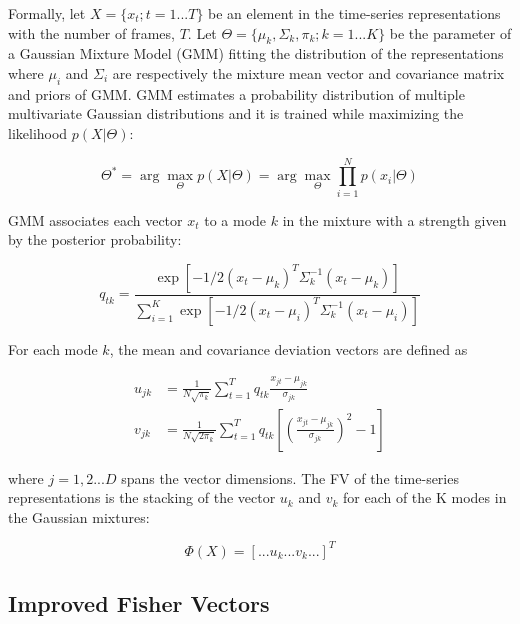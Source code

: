 Formally, let $X = \{x_t; t=1...T\}$ be an element in the time-series representations with the number of frames, $T$. Let $\Theta = \{\mu_k, \Sigma_k, \pi_k; k=1...K\}$ be the parameter of a Gaussian Mixture Model (GMM) fitting the distribution of the representations where $\mu_i$ and $\Sigma_i$ are respectively the mixture mean vector and covariance matrix and priors of GMM. GMM estimates a probability distribution of multiple multivariate Gaussian distributions and it is trained while maximizing the likelihood $p(X|\Theta)$:

\begin{equation}
    \Theta^{*} = \arg \max_{\Theta} p(X|\Theta) = \arg \max_{\Theta} \prod_{i=1}^{N} p(x_i|\Theta)
\end{equation}

GMM associates each vector $x_t$ to a mode $k$ in the mixture with a strength given by the posterior probability:

\begin{equation}
    q_{tk} = \frac{\exp [-1/2 (x_t-\mu_k)^{T} \Sigma_k^{-1}(x_t-\mu_k)]}{\sum_{i=1}^{K} \exp [-1/2 (x_t-\mu_i)^{T} \Sigma_k^{-1}(x_t-\mu_i)]}
\end{equation}

For each mode $k$, the mean and covariance deviation vectors are defined as 

\begin{align}
    u_{jk} &= \frac{1}{N\sqrt{\pi_k}} \sum_{t=1}^T q_{tk}\frac{x_{jt}-\mu_{jk}}{\sigma_{jk}} \\
    v_{jk} &= \frac{1}{N\sqrt{2\pi_k}} \sum_{t=1}^T q_{tk}[(\frac{x_{jt}-\mu_{jk}}{\sigma_{jk}})^2 - 1]
\end{align}

where $j=1,2...D$ spans the vector dimensions. The FV of the time-series representations is the stacking of the vector $u_k$ and $v_k$ for each of the K modes in the Gaussian mixtures:

\begin{equation}
    \Phi(X) = [...u_k...v_k...]^T
\end{equation}

\subsection{Improved Fisher Vectors}

